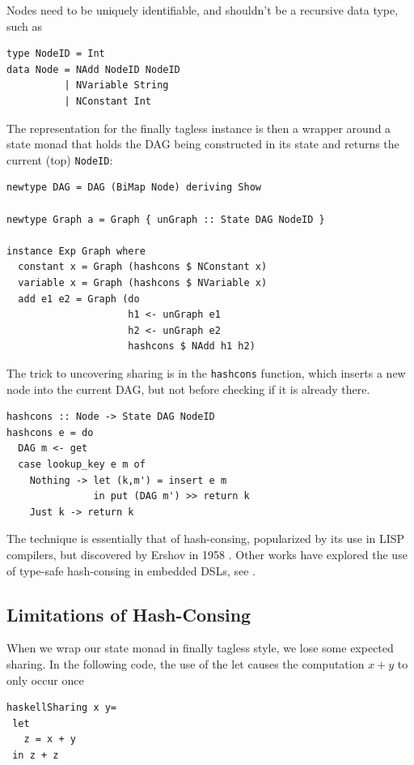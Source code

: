 \documentclass[runningheads]{llncs}
\begin{document}
Nodes need to be uniquely identifiable, and shouldn't be a recursive data type,
such as
\begin{verbatim}
type NodeID = Int
data Node = NAdd NodeID NodeID
          | NVariable String
          | NConstant Int
\end{verbatim}
The representation for the finally tagless
instance is then a wrapper around a state monad that holds the DAG being constructed in its state and
returns the current (top) \texttt{NodeID}:
\begin{verbatim}
newtype DAG = DAG (BiMap Node) deriving Show

newtype Graph a = Graph { unGraph :: State DAG NodeID }

instance Exp Graph where
  constant x = Graph (hashcons $ NConstant x)
  variable x = Graph (hashcons $ NVariable x)
  add e1 e2 = Graph (do
                     h1 <- unGraph e1
                     h2 <- unGraph e2
                     hashcons $ NAdd h1 h2)
\end{verbatim}
The trick to uncovering sharing is in the
\texttt{hashcons} function, which inserts a new node into the current DAG, but not
before checking if it is already there.
\begin{verbatim}
hashcons :: Node -> State DAG NodeID
hashcons e = do
  DAG m <- get
  case lookup_key e m of
    Nothing -> let (k,m') = insert e m
               in put (DAG m') >> return k
    Just k -> return k
\end{verbatim}
The technique is essentially that of
hash-consing, popularized by its use in LISP compilers, but discovered by Ershov in 1958 \cite{ershov1958:consing}. Other works have explored the use
of type-safe hash-consing in embedded DSLs, see \cite{filliatre:typesafeconsing}.

\subsection{Limitations of Hash-Consing} \label{limithashcons}

When we wrap our state monad in finally tagless style, we lose some expected sharing. In the following code, the use of the let causes the computation $x + y$ to only occur once
\begin{verbatim}
haskellSharing x y=
 let
   z = x + y
 in z + z
\end{verbatim}
\end{document}
